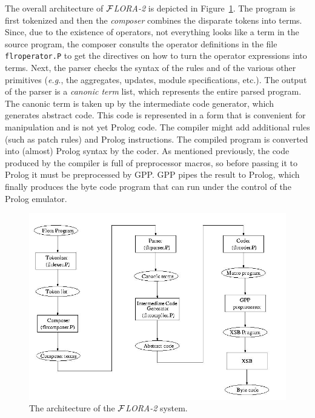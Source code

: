 \documentclass[11pt]{article}
\newcommand{\FLORA}{{\mbox{${\cal F}${\small\it LORA}\rm\emph{-2}}}\xspace}
\begin{document}
The overall architecture of \FLORA is depicted in Figure~\ref{fig-arch}.
The program is first tokenized and then the \emph{composer} combines the
disparate tokens into terms. Since, due to the existence of operators, not
everything looks like a term in the source program, the composer consults
the operator definitions in the file {\tt flroperator.P} to get the
directives on how to turn the operator expressions into terms. Next, the
parser checks the syntax of the rules and of the various other primitives
({\it e.g.}, the aggregates, updates, module specifications, etc.). The
output of the parser is a \emph{canonic term} list, which represents the
entire parsed program. The canonic term is taken up by the intermediate
code generator, which generates abstract code. This code is represented in
a form that is convenient for manipulation and is not yet Prolog code.  The
compiler might add additional rules (such as patch rules) and Prolog
instructions. The compiled program is converted into (almost) Prolog syntax
by the coder. As mentioned previously, the code produced by the compiler is
full of preprocessor macros, so before passing it to Prolog it must be
preprocessed by GPP. GPP pipes the result to Prolog, which finally produces
the byte code program that can run under the control of the Prolog
emulator.

\begin{figure}[bt]
  \begin{center}
    \includegraphics[width=5.5in]{architecture}
  \end{center}
  \caption{The architecture of the \FLORA system.}
  \label{fig-arch}
\end{figure}
\end{document}
